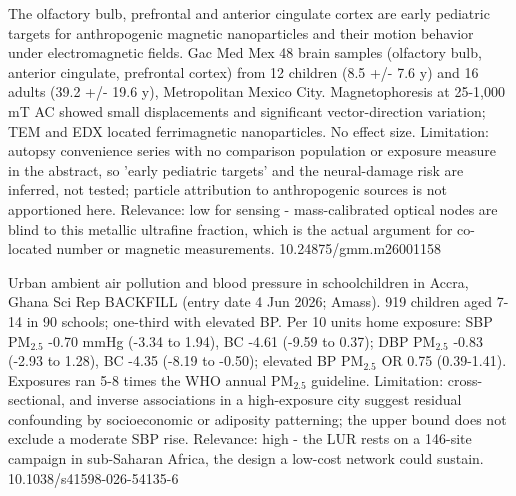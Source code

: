 \documentclass[10pt]{article}
\begin{document}

{The olfactory bulb, prefrontal and anterior cingulate cortex are early pediatric targets for anthropogenic magnetic nanoparticles and their motion behavior under electromagnetic fields.}
{Gac Med Mex}
{48 brain samples (olfactory bulb, anterior cingulate, prefrontal cortex) from 12 children (8.5 +/- 7.6 y) and 16 adults (39.2 +/- 19.6 y), Metropolitan Mexico City. Magnetophoresis at 25-1,000 mT AC showed small displacements and significant vector-direction variation; TEM and EDX located ferrimagnetic nanoparticles. No effect size. Limitation: autopsy convenience series with no comparison population or exposure measure in the abstract, so 'early pediatric targets' and the neural-damage risk are inferred, not tested; particle attribution to anthropogenic sources is not apportioned here. Relevance: low for sensing - mass-calibrated optical nodes are blind to this metallic ultrafine fraction, which is the actual argument for co-located number or magnetic measurements.}
{10.24875/gmm.m26001158}

\par{}\baselineskip{}\baselineskip
{}

{Urban ambient air pollution and blood pressure in schoolchildren in Accra, Ghana}
{Sci Rep}
{BACKFILL (entry date 4 Jun 2026; Amass). 919 children aged 7-14 in 90 schools; one-third with elevated BP. Per 10 units home exposure: SBP PM$_{2.5}$ -0.70 mmHg (-3.34 to 1.94), BC -4.61 (-9.59 to 0.37); DBP PM$_{2.5}$ -0.83 (-2.93 to 1.28), BC -4.35 (-8.19 to -0.50); elevated BP PM$_{2.5}$ OR 0.75 (0.39-1.41). Exposures ran 5-8 times the WHO annual PM$_{2.5}$ guideline. Limitation: cross-sectional, and inverse associations in a high-exposure city suggest residual confounding by socioeconomic or adiposity patterning; the upper bound does not exclude a moderate SBP rise. Relevance: high - the LUR rests on a 146-site campaign in sub-Saharan Africa, the design a low-cost network could sustain.}
{10.1038/s41598-026-54135-6}

\par{}\baselineskip{}\baselineskip
{}
\end{document}
